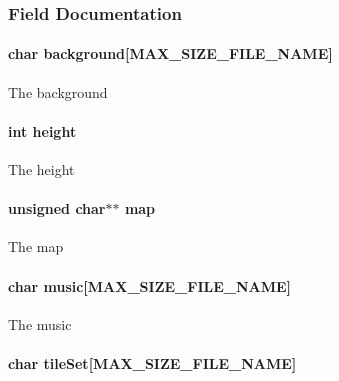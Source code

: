 \subsubsection{Field Documentation}
\hypertarget{struct_level_a138d74a180ed8126b24d9b9b5b135882}{
\paragraph[{background}]{\setlength{\rightskip}{0pt plus 5cm}char background\mbox{[}{\bf M\-A\-X\-\_\-\-S\-I\-Z\-E\-\_\-\-F\-I\-L\-E\-\_\-\-N\-A\-M\-E}\mbox{]}}}\label{struct_level_a138d74a180ed8126b24d9b9b5b135882}
The background \hypertarget{struct_level_ad12fc34ce789bce6c8a05d8a17138534}{
\paragraph[{height}]{\setlength{\rightskip}{0pt plus 5cm}int height}}\label{struct_level_ad12fc34ce789bce6c8a05d8a17138534}
The height \hypertarget{struct_level_a6d985f8729c187f1c35dabba2738f0bd}{
\paragraph[{map}]{\setlength{\rightskip}{0pt plus 5cm}unsigned char$\ast$$\ast$ map}}\label{struct_level_a6d985f8729c187f1c35dabba2738f0bd}
The map \hypertarget{struct_level_a16d4a8b2aa62b5e644923bdf44da16f7}{
\paragraph[{music}]{\setlength{\rightskip}{0pt plus 5cm}char music\mbox{[}{\bf M\-A\-X\-\_\-\-S\-I\-Z\-E\-\_\-\-F\-I\-L\-E\-\_\-\-N\-A\-M\-E}\mbox{]}}}\label{struct_level_a16d4a8b2aa62b5e644923bdf44da16f7}
The music \hypertarget{struct_level_a65e1491050070e8d940ac310bb3ee901}{
\paragraph[{tile\-Set}]{\setlength{\rightskip}{0pt plus 5cm}char tile\-Set\mbox{[}{\bf M\-A\-X\-\_\-\-S\-I\-Z\-E\-\_\-\-F\-I\-L\-E\-\_\-\-N\-A\-M\-E}\mbox{]}}}\label{struct_level_a65e1491050070e8d940ac310bb3ee901}
